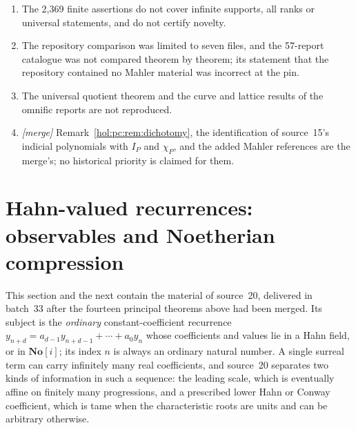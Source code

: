 \documentclass[11pt]{article}
\numberwithin{equation}{section}
\theoremstyle{definition}
\theoremstyle{remark}
\newcommand{\No}{\mathbf{No}}
\begin{document}
\begin{enumerate}[label=\textup{(P\arabic*)}]
\item The 2{,}369 finite assertions do not cover infinite supports, all ranks or
universal statements, and do not certify novelty.
\item The repository comparison was limited to seven files, and the 57-report
catalogue was not compared theorem by theorem; its statement that the
repository contained no Mahler material was incorrect at the pin.
\item The universal quotient theorem and the curve and lattice results of the
omnific reports are not reproduced.
\item \emph{[merge]} Remark~\ref{hol:pc:rem:dichotomy}, the identification of
source~15's indicial polynomials with $I_P$ and $\chi_P$, and the added
Mahler references are the merge's; no historical priority is claimed for
them.
\end{enumerate}

\section{Hahn-valued recurrences: observables and Noetherian compression}\label{hol:rc:sec:setting}

This section and the next contain the material of source~20, delivered in
batch~33 after the fourteen principal theorems above had been merged. Its
subject is the \emph{ordinary} constant-coefficient recurrence
$y_{n+d}=a_{d-1}y_{n+d-1}+\cdots+a_0y_n$ whose coefficients and values lie in a
Hahn field, or in $\No[i]$; its index $n$ is always an ordinary natural number.
A single surreal term can carry infinitely many real coefficients, and
source~20 separates two kinds of information in such a sequence: the leading
scale, which is eventually affine on finitely many progressions, and a
prescribed lower Hahn or Conway coefficient, which is tame when the
characteristic roots are units and can be arbitrary otherwise.
\end{document}
